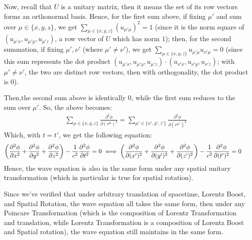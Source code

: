 \documentclass{article}
\DeclarePairedDelimiter{\paran}{(}{)}%
\begin{document}
Now, recall that $U$ is a unitary matrix, then it means the set of its row vectors forms an orthonormal basis. Hence, for the first sum above, if fixing $\mu'$ and sum over $\mu\in\{x,y,z\}$, we get $\sum_{\mu\in\{x,y,z\}}(u_{\mu'\mu})^2 = 1$ (since it is the norm square of $(u_{\mu'x},u_{\mu'y},u_{\mu'z})$, a row vector of $U$ which has norm $1$); then, for the second summation, if fixing $\mu', \nu'$ (where $\mu'\neq \nu'$), we get $\sum_{\mu\in\{x,y,z\}}u_{\mu'\mu}u_{\nu'\mu}=0$ (since this sum represents the dot product $(u_{\mu'x},u_{\mu'y},u_{\mu'z})\cdot (u_{\nu'x},u_{\nu'y},u_{\nu'z})$; with $\mu'\neq \nu'$, the two are distinct row vectors, then with orthogonality, the dot product is $0$). 

Then,the second sum above is identically $0$, while the first sum reduces to the sum over $\mu'$. So, the above becomes:
\begin{align}
    \sum_{\mu\in \{x,y,z\}}\frac{\partial^2\phi}{\partial (r^\mu)^2} = \sum_{\mu'\in\{x',y',z'\}}
\frac{\partial^2\phi}{\partial (r^{\mu'})^2}\end{align}
Which, with $t=t'$, we get the following equation:
\begin{align}
    &\paran*{\frac{\partial^2\phi}{\partial x^2}+\frac{\partial^2\phi}{\partial y^2}+\frac{\partial^2\phi}{\partial z^2}}-\frac{1}{c^2}\frac{\partial^2\phi}{\partial t^2} = 0 \iff \paran*{\frac{\partial^2\phi}{\partial(x')^2}+\frac{\partial^2\phi}{\partial (y')^2}+\frac{\partial^2\phi}{\partial (z')^2}}-\frac{1}{c^2}\frac{\partial^2\phi}{\partial (t')^2} = 0
\end{align}
Hence, the wave equation is also in the same form under any spatial unitary transformation (which in particular is true for spatial rotation).

\hfil

Since we've verified that under arbitrary translation of spacetime, Lorentz Boost, and Spatial Rotation, the wave equation all takes the same form, then under any Poincare Transformation (which is the composition of Lorentz Transformation and translation, while Lorentz Transformation is a composition of Lorentz Boost and Spatial rotation), the wave equation still maintains in the same form.
\end{document}
